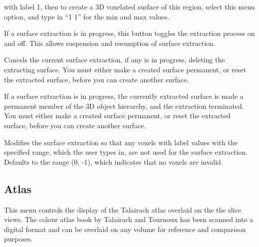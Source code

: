 \documentclass[11pt,letterpaper]{article}
\newcommand{\menutwo}[2]{{\scriptsize \fbox{\bf #1}/\fbox{\bf #2}}}
\begin{document}
\begin{description}
    with label 1, then to create a 3D voxelated surface of this region,
    select this menu option, and type in ``1 1'' for the min and max values.
\item[\menutwo{Create Surface}{Extracting}]  If a surface extraction
    is in progress, this button toggles the extraction process on and
    off.  This allows suspension and resumption of surface extraction.
\item[\menutwo{Create Surface}{Reset Surface}] Cancels the current
  surface extraction, if any is in progress, deleting the extracting
  surface. You must either make a created surface permanent, or reset
  the extracted surface, before you can create another surface.
\item[\menutwo{Create Surface}{Make Permanent}] If a surface
  extraction is in progress, the currently extracted surface is made a
  permanent member of the 3D object hierarchy, and the extraction
  terminated.  You must either make a created surface permanent, or
  reset the extracted surface, before you can create another surface.
\item[\menutwo{Create Surface}{Set Invalid Lbl Range}]  Modifies the surface
    extraction so that any voxels with label values with the specified range,
    which the user types in, are not used for the surface extraction.
    Defaults to the range (0, -1), which indicates that no voxels are invalid.
\end{description}

\subsection{Atlas}

This menu controls the display of the Talairach atlas overlaid on the
the slice views.  The colour atlas book by Talairach and Tournoux
has been scanned into a digital
format and can be overlaid on any volume for reference and comparison
purposes.
\end{document}
